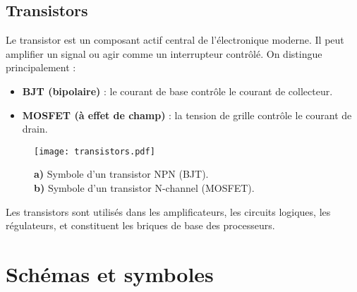 \subsection{Transistors} \label{subsec:transistors}
Le transistor est un composant actif central de l’électronique moderne.
Il peut amplifier un signal ou agir comme un interrupteur contrôlé.
On distingue principalement :
\begin{itemize}
  \item \textbf{BJT (bipolaire)} : le courant de base contrôle
  le courant de collecteur.
  \item \textbf{MOSFET (à effet de champ)} : la tension de grille contrôle
  le courant de drain.
\end{itemize}

\begin{figure}[H]
    \centering
    \texttt{[image: transistors.pdf]}
    \caption{\centering\newline
        \textbf{a)} Symbole d’un transistor NPN (BJT).\\
        \textbf{b)} Symbole d’un transistor N-channel (MOSFET).
    }
\end{figure}

Les transistors sont utilisés dans les amplificateurs,
les circuits logiques, les régulateurs, et constituent les briques de base des processeurs.

\section{Schémas et symboles} \label{subsec:schematics_symbols}
